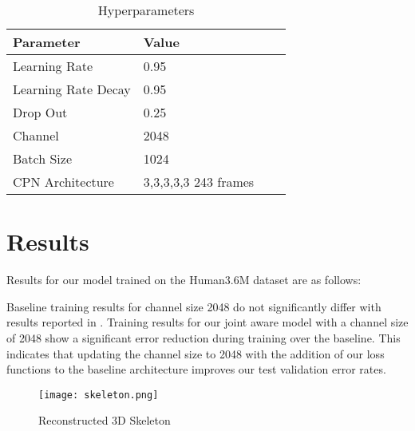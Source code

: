 \documentclass[runningheads]{llncs}
\begin{document}
\begin{table}
\caption{Hyperparameters}
\begin{center}
\small
\begin{tabular}{|l|l|l|l|}
\hline

\textbf{Parameter} &
\textbf{Value}\\
\hline
        Learning Rate&
        0.95
        \\
\hline
        Learning Rate Decay&
        0.95
        \\
\hline
        Drop Out &
        0.25
        \\
\hline
        Channel &
        2048
        \\
\hline
        Batch Size &
        1024
        \\
\hline
        CPN Architecture&
        3,3,3,3,3 243 frames
        \\
\hline
\end{tabular}
\end{center}
\label{table:hyperparameters}
\end{table}

\section{Results}

Results for our model trained on the Human3.6M dataset are as follows:

Baseline training results for channel size 2048 do not significantly differ with results reported in \cite{pavllo20193d}.
Training results for our joint aware model with a channel size of 2048 show a significant error reduction during training over the baseline. This indicates that updating the channel size to 2048 with the addition of our loss functions to the baseline architecture improves our test validation error rates.

\begin{figure}
  \texttt{[image: skeleton.png]}
  \caption{Reconstructed 3D Skeleton}
  \label{fig:skeleton}
\end{figure}
\end{document}

